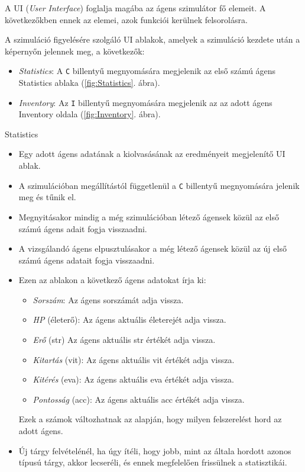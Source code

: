\label{UI}

A UI (\textit{User Interface}) foglalja magába az ágens szimulátor fő elemeit. A következőkben ennek az elemei, azok funkciói kerülnek felsorolásra.

\medskip

\noindent A szimuláció figyelésére szolgáló UI ablakok, amelyek a szimuláció kezdete után a képernyőn jelennek meg, a következők:

\begin{itemize}
    \item \textit{Statistics}: A \texttt{C} billentyű megnyomására megjelenik az első számú ágens Statistics ablaka (\ref{fig:Statistics}. ábra).
    \item \textit{Inventory}: Az \texttt{I} billentyű megnyomására megjelenik az az adott ágens Inventory oldala (\ref{fig:Inventory}. ábra).
\end{itemize}

\noindent Statistics

\begin{itemize}
    \item Egy adott ágens adatának a kiolvasásának az eredményeit megjelenítő UI ablak. 
    \item A szimulációban megállítástól függetlenül a \texttt{C} billentyű megnyomására jelenik meg és tűnik el.
    \item Megnyitásakor mindig a még szimulációban létező ágensek közül az első számú ágens adait fogja visszaadni.
    \item A vizsgálandó ágens elpusztulásakor a még létező ágensek közül az új első számú ágens adatait fogja visszaadni.
    \item Ezen az ablakon a következő ágens adatokat írja ki:
    \begin{itemize}
    \item \textit{Sorszám}: Az ágens sorszámát adja vissza.
    \item \textit{HP} (életerő): Az ágens aktuális életerejét adja vissza.
    \item \textit{Erő} (str) Az ágens aktuális str értékét adja vissza.
    \item \textit{Kitartás} (vit): Az ágens aktuális vit értékét adja vissza.
    \item \textit{Kitérés} (eva): Az ágens aktuális eva értékét adja vissza.
    \item \textit{Pontosság} (acc): Az ágens aktuális acc értékét adja vissza.
    \end{itemize}
    Ezek a számok változhatnak az alapján, hogy milyen felszerelést hord az adott ágens.
    \item Új tárgy felvételénél, ha úgy ítéli, hogy jobb, mint az általa hordott azonos típusú tárgy, akkor lecseréli, és ennek megfelelően frissülnek a statisztikái.
\end{itemize}

